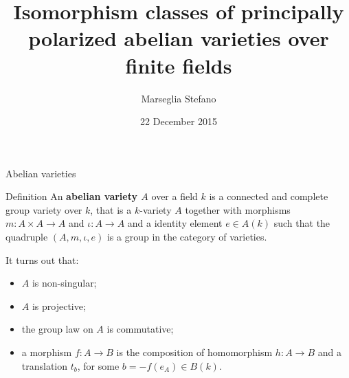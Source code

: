 \documentclass{beamer}
\title[]{Isomorphism classes of principally polarized abelian varieties over finite fields}
\author[Marseglia Stefano]{Marseglia Stefano}
\institute[]{Stockholms Universitet}
\date{22 December 2015}
\DeclareMathOperator{\ICM}{ICM}
\begin{document}
\begin{frame}
\titlepage
\end{frame}


\begin{frame}{Abelian varieties}

  \begin{block}{Definition}
    An \textbf{abelian variety $A$} over a field $k$ is a connected and complete group variety over $k$, that is a $k$-variety $A$ together with morphisms $m:A \times A \to A$ and $\iota: A \to A$ and a identity element $e\in A(k)$ such that the quadruple $(A,m,\iota, e)$ is a group in the category of varieties.
  \end{block}
\pause
  It turns out that:
  \begin{itemize}
   \item $A$ is non-singular;
   \item $A$ is projective;
   \item the group law on $A$ is commutative;
   \item a morphism $f:A\to B$ is the composition of homomorphism $h: A \to B$ and a translation $t_b$, for some $b=-f(e_A)\in B(k)$.
  \end{itemize}
\end{frame}
\end{document}
